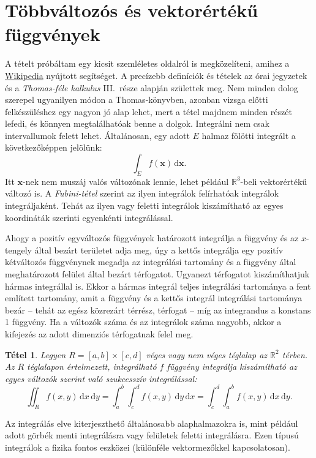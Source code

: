 \documentclass[%
	DIV=15,appendixprefix]{scrreprt}
\newtheorem*{tetel}{Tétel}
\theoremstyle{definition}
\theoremstyle{remark}
\begin{document}
\section{Többváltozós és vektorértékű függvények}
A tételt próbáltam egy kicsit szemléletes oldalról is megközelíteni, amihez a
\href{https://www.wikipedia.org/}{Wikipedia} nyújtott
segítséget. A precízebb definíciók és tételek az órai jegyzetek és a \emph{Thomas-féle kalkulus}
III.~része \cite[16.~fejezet]{Thomas} alapján születtek meg. Nem minden dolog szerepel ugyanilyen
módon a Thomas-könyvben, azonban vizsga előtti felkészüléshez egy nagyon jó alap lehet, mert a tétel
majdnem minden részét lefedi, és könnyen megtalálhatóak benne a dolgok.
%
Integrálni nem csak intervallumok felett lehet. Általánosan, egy adott $ E $ halmaz fölötti
integrált a következőképpen jelölünk:
\begin{equation*}
	\int_{ E } f \left( \mathbf{ x } \right) \, \mathrm{ d } \mathbf{ x }.
\end{equation*}
Itt $ \mathbf{ x } $-nek nem muszáj valós változónak lennie, lehet például
$ \mathbb{ R }^{ 3 }$-beli vektorértékű változó is. A \emph{Fubini-tétel} szerint az ilyen
integrálok felírhatóak integrálok integráljaként. Tehát az ilyen  vagy
 feletti integrálok kiszámítható az egyes koordináták szerinti egyenkénti
integrálással.

Ahogy a pozitív egyváltozós függvények határozott integrálja a függvény és az $ x $-tengely által
bezárt területet adja meg, úgy a kettős integrálja egy pozitív kétváltozós függvénynek megadja az
integrálási tartomány és a függvény által meghatározott felület által bezárt térfogatot. Ugyanezt
térfogatot kiszámíthatjuk hármas integrállal is. Ekkor a hármas integrál teljes integrálási
tartománya a fent említett tartomány, amit a függvény és a kettős integrál integrálási tartománya
bezár -- tehát az egész közrezárt térrész, térfogat -- míg az integrandus a konstans 1 függvény. Ha
a változók száma és az integrálok száma nagyobb, akkor a kifejezés az adott dimenziós térfogatnak
felel meg.

\begin{tetel}
	Legyen $ R = \left[ a,{} b \right] \times \left[ c,{} d \right]$ véges vagy nem véges téglalap
	az $ \mathbb{ R }^{ 2 } $ térben. Az $ R $ téglalapon értelmezett, integrálható $ f $ függvény
	integrálja kiszámítható az egyes változók szerint való szukcesszív integrálással:
	\begin{equation*}
		\iint_{ R } f \left( x,{} y  \right) \, \mathrm{ d } x \, \mathrm{ d } y = \int_{ a }^{ b }
		\int_{ c }^{ d } f \left( x,{} y  \right) \, \mathrm{ d } y \, \mathrm{ d } x =
		\int_{ c }^{ d } \int_{ a }^{ b } f \left( x,{} y  \right) \, \mathrm{ d } x \,
		\mathrm{ d } y.
	\end{equation*}
\end{tetel}
%
Az integrálás elve kiterjeszthető általánosabb alaphalmazokra is, mint például adott görbék menti
integrálásra vagy felületek feletti integrálásra. Ezen típusú integrálok a fizika fontos eszközei
(különféle vektormezőkkel kapcsolatosan).
\end{document}
